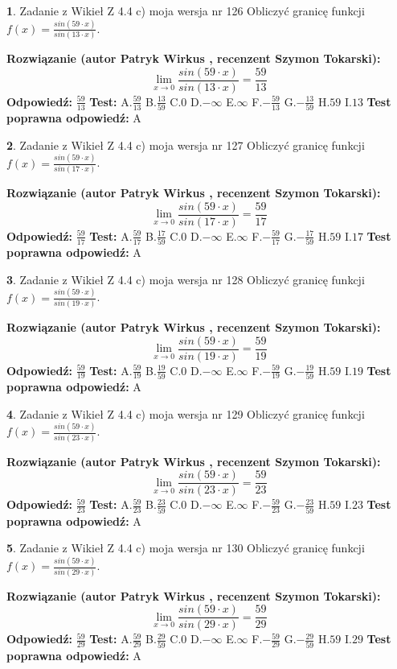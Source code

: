 \documentclass[12pt, a4paper]{article}
\theoremstyle{definition} %
\newtheorem{zad}{}
\newcommand{\zadStart}[1]{\begin{zad}#1\newline}
\newcommand{\zadStop}{\end{zad}}
\newcommand{\rozwStart}[2]{\noindent \textbf{Rozwiązanie (autor #1 , recenzent #2): }\newline}
\newcommand{\rozwStop}{\newline}
\newcommand{\odpStart}{\noindent \textbf{Odpowiedź:}\newline}
\newcommand{\odpStop}{\newline}
\newcommand{\testStart}{\noindent \textbf{Test:}\newline}
\newcommand{\testStop}{\newline}
\newcommand{\kluczStart}{\noindent \textbf{Test poprawna odpowiedź:}\newline}
\newcommand{\kluczStop}{\newline}
\begin{document}
\zadStart{Zadanie z Wikieł Z 4.4 c) moja wersja nr 126}
Obliczyć granicę funkcji $f(x)=\frac{sin(59\cdot x)}{sin(13\cdot x)}$.
\zadStop
\rozwStart{Patryk Wirkus}{Szymon Tokarski}
$$\lim\limits_{x\to 0}\frac{sin(59\cdot x)}{sin(13\cdot x)}=
\frac{59}{13}$$
\rozwStop
\odpStart
$\frac{59}{13}$
\odpStop
\testStart
A.$\frac{59}{13}$
B.$\frac{13}{59}$
C.$0$
D.$-\infty$
E.$\infty$
F.$-\frac{59}{13}$
G.$-\frac{13}{59}$
H.$59$
I.$13$
\testStop
\kluczStart
A
\kluczStop



\zadStart{Zadanie z Wikieł Z 4.4 c) moja wersja nr 127}
Obliczyć granicę funkcji $f(x)=\frac{sin(59\cdot x)}{sin(17\cdot x)}$.
\zadStop
\rozwStart{Patryk Wirkus}{Szymon Tokarski}
$$\lim\limits_{x\to 0}\frac{sin(59\cdot x)}{sin(17\cdot x)}=
\frac{59}{17}$$
\rozwStop
\odpStart
$\frac{59}{17}$
\odpStop
\testStart
A.$\frac{59}{17}$
B.$\frac{17}{59}$
C.$0$
D.$-\infty$
E.$\infty$
F.$-\frac{59}{17}$
G.$-\frac{17}{59}$
H.$59$
I.$17$
\testStop
\kluczStart
A
\kluczStop



\zadStart{Zadanie z Wikieł Z 4.4 c) moja wersja nr 128}
Obliczyć granicę funkcji $f(x)=\frac{sin(59\cdot x)}{sin(19\cdot x)}$.
\zadStop
\rozwStart{Patryk Wirkus}{Szymon Tokarski}
$$\lim\limits_{x\to 0}\frac{sin(59\cdot x)}{sin(19\cdot x)}=
\frac{59}{19}$$
\rozwStop
\odpStart
$\frac{59}{19}$
\odpStop
\testStart
A.$\frac{59}{19}$
B.$\frac{19}{59}$
C.$0$
D.$-\infty$
E.$\infty$
F.$-\frac{59}{19}$
G.$-\frac{19}{59}$
H.$59$
I.$19$
\testStop
\kluczStart
A
\kluczStop



\zadStart{Zadanie z Wikieł Z 4.4 c) moja wersja nr 129}
Obliczyć granicę funkcji $f(x)=\frac{sin(59\cdot x)}{sin(23\cdot x)}$.
\zadStop
\rozwStart{Patryk Wirkus}{Szymon Tokarski}
$$\lim\limits_{x\to 0}\frac{sin(59\cdot x)}{sin(23\cdot x)}=
\frac{59}{23}$$
\rozwStop
\odpStart
$\frac{59}{23}$
\odpStop
\testStart
A.$\frac{59}{23}$
B.$\frac{23}{59}$
C.$0$
D.$-\infty$
E.$\infty$
F.$-\frac{59}{23}$
G.$-\frac{23}{59}$
H.$59$
I.$23$
\testStop
\kluczStart
A
\kluczStop



\zadStart{Zadanie z Wikieł Z 4.4 c) moja wersja nr 130}
Obliczyć granicę funkcji $f(x)=\frac{sin(59\cdot x)}{sin(29\cdot x)}$.
\zadStop
\rozwStart{Patryk Wirkus}{Szymon Tokarski}
$$\lim\limits_{x\to 0}\frac{sin(59\cdot x)}{sin(29\cdot x)}=
\frac{59}{29}$$
\rozwStop
\odpStart
$\frac{59}{29}$
\odpStop
\testStart
A.$\frac{59}{29}$
B.$\frac{29}{59}$
C.$0$
D.$-\infty$
E.$\infty$
F.$-\frac{59}{29}$
G.$-\frac{29}{59}$
H.$59$
I.$29$
\testStop
\kluczStart
A
\kluczStop
\end{document}

